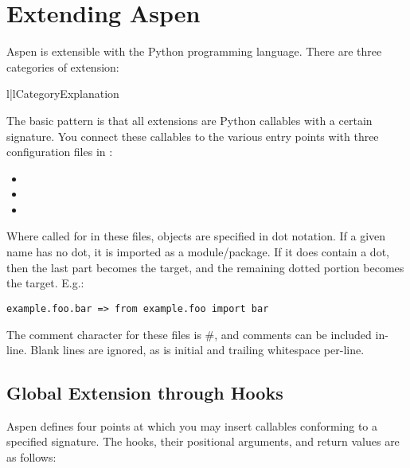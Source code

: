 \chapter{Extending Aspen}

Aspen is extensible with the Python programming language. There are three
categories of extension:

\begin{tableii}{l|l}{}{Category}{Explanation}
\end{tableii}

The basic pattern is that all extensions are Python callables with a certain
signature. You connect these callables to the various entry points with three
configuration files in :

\begin{itemize}
\item{}
\item{}
\item{}
\end{itemize}

Where called for in these files, objects are specified in dot notation. If a
given name has no dot, it is imported as a module/package. If it does contain a
dot, then the last part becomes the  target, and the remaining
dotted portion becomes the  target. E.g.:

\begin{verbatim}
example.foo.bar => from example.foo import bar
\end{verbatim}

The comment character for these files is \#, and comments can be included
in-line. Blank lines are ignored, as is initial and trailing whitespace
per-line.

\section{Global Extension through Hooks}

Aspen defines four points at which you may insert callables conforming to a
specified signature. The hooks, their positional arguments, and return values
are as follows:


